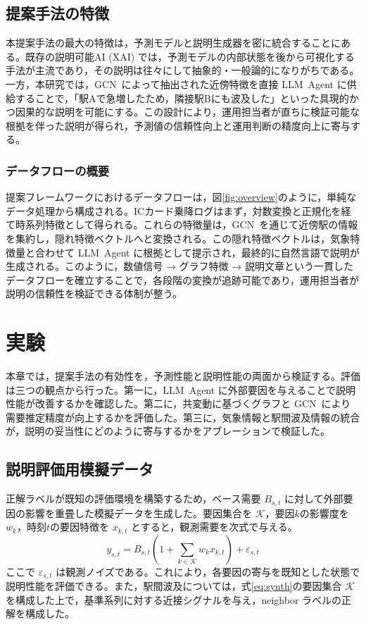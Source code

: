 \documentclass[technicalreport]{ieicej}
\newcommand{\LLM}{LLM}
\newcommand{\GCN}{GCN}
\begin{document}
\subsection{提案手法の特徴}
本提案手法の最大の特徴は，予測モデルと説明生成器を密に統合することにある。既存の説明可能AI (XAI) では，予測モデルの内部状態を後から可視化する手法が主流であり，その説明は往々にして抽象的・一般論的になりがちである。一方，本研究では，\GCN\ によって抽出された近傍特徴を直接 \LLM\ Agent に供給することで，「駅Aで急増したため，隣接駅Bにも波及した」といった具現的かつ因果的な説明を可能にする。この設計により，運用担当者が直ちに検証可能な根拠を伴った説明が得られ，予測値の信頼性向上と運用判断の精度向上に寄与する。

\subsubsection{データフローの概要}
提案フレームワークにおけるデータフローは，図\ref{fig:overview}のように，単純なデータ処理から構成される。ICカード乗降ログはまず，対数変換と正規化を経て時系列特徴として得られる。これらの特徴量は，\GCN\ を通じて近傍駅の情報を集約し，隠れ特徴ベクトルへと変換される。この隠れ特徴ベクトルは，気象特徴量と合わせて \LLM\ Agent に根拠として提示され，最終的に自然言語で説明が生成される。このように，数値信号 → グラフ特徴 → 説明文章という一貫したデータフローを確立することで，各段階の変換が追跡可能であり，運用担当者が説明の信頼性を検証できる体制が整う。

\section{実験}
本章では，提案手法の有効性を，予測性能と説明性能の両面から検証する。評価は三つの観点から行った。第一に，\LLM\ Agent に外部要因を与えることで説明性能が改善するかを確認した。第二に，共変動に基づくグラフと \GCN\ により需要推定精度が向上するかを評価した。第三に，気象情報と駅間波及情報の統合が，説明の妥当性にどのように寄与するかをアブレーションで検証した。

\subsection{説明評価用模擬データ}
正解ラベルが既知の評価環境を構築するため，ベース需要 $B_{s,t}$ に対して外部要因の影響を重畳した模擬データを生成した。要因集合を $\mathcal{K}$，要因$k$の影響度を $w_k$，時刻$t$の要因特徴を $x_{k,t}$ とすると，観測需要を次式で与える。
\begin{equation}
y_{s,t}=B_{s,t}\left(1+\sum_{k\in\mathcal{K}}w_kx_{k,t}\right)+\varepsilon_{s,t}
\label{eq:synth}
\end{equation}
ここで $\varepsilon_{s,t}$ は観測ノイズである。これにより，各要因の寄与を既知とした状態で説明性能を評価できる。また，駅間波及については，式\eqref{eq:synth}の要因集合 $\mathcal{K}$ を構成した上で，基準系列に対する近接シグナルを与え，neighbor ラベルの正解を構成した。
\end{document}
